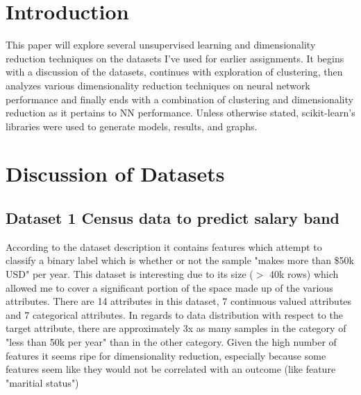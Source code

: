 \documentclass[11pt]{article}
\newcommand{\datasetone}{Census data to predict salary band}
\begin{document}
    \thispagestyle{firstpage}


    \section{Introduction}\label{sec:introduction}
    This paper will explore several unsupervised learning and dimensionality reduction techniques on the datasets I've
    used for earlier assignments.
    It begins with a discussion of the datasets, continues with exploration of clustering, then analyzes various dimensionality
    reduction techniques on neural network performance and finally ends with a combination of clustering and dimensionality
    reduction as it pertains to NN performance.
    Unless otherwise stated, scikit-learn's libraries were used to generate models, results, and graphs.


    \section{Discussion of Datasets}\label{sec:discussion-of-datasets}

    \subsection{Dataset 1 \datasetone}\label{subsec:dataset-1datasetone}
    According to the dataset description\cite{Dua:2019} it contains features which attempt to classify a binary label which is whether or not the sample "makes more than \$50k USD" per year.
    This dataset is interesting due to its size ($>$ 40k rows) which allowed me to cover a significant portion of the space made up of the various attributes.
    There are 14 attributes in this dataset, 7 continuous valued attributes and 7 categorical attributes.
    In regards to data distribution with respect to the target attribute, there are approximately 3x as many samples in the category of "less than 50k per year" than in the other category.
    Given the high number of features it seems ripe for dimensionality reduction, especially because some features seem like they would not be correlated with an outcome (like feature "maritial status")
\end{document}

